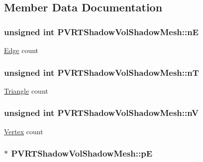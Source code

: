 \subsection{Member Data Documentation}
\hypertarget{struct_p_v_r_t_shadow_vol_shadow_mesh_a3cd121dcb7b62a9bc0234c08f94a1cda}{
\subsubsection[{n\+E}]{\setlength{\rightskip}{0pt plus 5cm}unsigned int P\+V\+R\+T\+Shadow\+Vol\+Shadow\+Mesh\+::n\+E}}\label{struct_p_v_r_t_shadow_vol_shadow_mesh_a3cd121dcb7b62a9bc0234c08f94a1cda}
\hyperlink{struct_edge}{Edge} count \hypertarget{struct_p_v_r_t_shadow_vol_shadow_mesh_a35e421c0b2614b6745cc22addc1ad66a}{
\subsubsection[{n\+T}]{\setlength{\rightskip}{0pt plus 5cm}unsigned int P\+V\+R\+T\+Shadow\+Vol\+Shadow\+Mesh\+::n\+T}}\label{struct_p_v_r_t_shadow_vol_shadow_mesh_a35e421c0b2614b6745cc22addc1ad66a}
\hyperlink{class_triangle}{Triangle} count \hypertarget{struct_p_v_r_t_shadow_vol_shadow_mesh_ad544c76448e3990c1383b6236a302e71}{
\subsubsection[{n\+V}]{\setlength{\rightskip}{0pt plus 5cm}unsigned int P\+V\+R\+T\+Shadow\+Vol\+Shadow\+Mesh\+::n\+V}}\label{struct_p_v_r_t_shadow_vol_shadow_mesh_ad544c76448e3990c1383b6236a302e71}
\hyperlink{struct_vertex}{Vertex} count \hypertarget{struct_p_v_r_t_shadow_vol_shadow_mesh_aa8d63a37fc810362bc8e092ca9c6fdf5}{
\subsubsection[{p\+E}]{$\ast$ P\+V\+R\+T\+Shadow\+Vol\+Shadow\+Mesh\+::p\+E}}\label{struct_p_v_r_t_shadow_vol_shadow_mesh_aa8d63a37fc810362bc8e092ca9c6fdf5}
